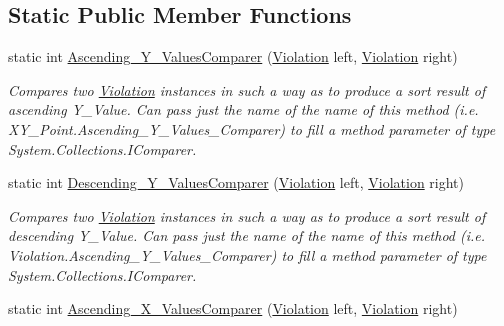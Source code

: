 \subsection*{Static Public Member Functions}
\begin{DoxyCompactItemize}
\item 
static int \mbox{\hyperlink{class_c_s_i_1_1_library_1_1_array_utilities_1_1_array_limit_checks_1_1_violation_a4e93e075cf895577206d1abfe44aa47f}{Ascending\+\_\+\+Y\+\_\+\+Values\+Comparer}} (\mbox{\hyperlink{class_c_s_i_1_1_library_1_1_array_utilities_1_1_array_limit_checks_1_1_violation}{Violation}} left, \mbox{\hyperlink{class_c_s_i_1_1_library_1_1_array_utilities_1_1_array_limit_checks_1_1_violation}{Violation}} right)
\begin{DoxyCompactList}\small\item\em Compares two \mbox{\hyperlink{class_c_s_i_1_1_library_1_1_array_utilities_1_1_array_limit_checks_1_1_violation}{Violation}} instances in such a way as to produce a sort result of ascending Y\+\_\+\+Value. Can pass just the name of the name of this method (i.\+e. X\+Y\+\_\+\+Point.\+Ascending\+\_\+\+Y\+\_\+\+Values\+\_\+\+Comparer) to fill a method parameter of type System.\+Collections.\+I\+Comparer. \end{DoxyCompactList}\item 
static int \mbox{\hyperlink{class_c_s_i_1_1_library_1_1_array_utilities_1_1_array_limit_checks_1_1_violation_a7c82d99abe8c6efbfcb6b7f58281c951}{Descending\+\_\+\+Y\+\_\+\+Values\+Comparer}} (\mbox{\hyperlink{class_c_s_i_1_1_library_1_1_array_utilities_1_1_array_limit_checks_1_1_violation}{Violation}} left, \mbox{\hyperlink{class_c_s_i_1_1_library_1_1_array_utilities_1_1_array_limit_checks_1_1_violation}{Violation}} right)
\begin{DoxyCompactList}\small\item\em Compares two \mbox{\hyperlink{class_c_s_i_1_1_library_1_1_array_utilities_1_1_array_limit_checks_1_1_violation}{Violation}} instances in such a way as to produce a sort result of descending Y\+\_\+\+Value. Can pass just the name of the name of this method (i.\+e. Violation.\+Ascending\+\_\+\+Y\+\_\+\+Values\+\_\+\+Comparer) to fill a method parameter of type System.\+Collections.\+I\+Comparer. \end{DoxyCompactList}\item 
static int \mbox{\hyperlink{class_c_s_i_1_1_library_1_1_array_utilities_1_1_array_limit_checks_1_1_violation_a152a375e0f4b3b218539d093b359452f}{Ascending\+\_\+\+X\+\_\+\+Values\+Comparer}} (\mbox{\hyperlink{class_c_s_i_1_1_library_1_1_array_utilities_1_1_array_limit_checks_1_1_violation}{Violation}} left, \mbox{\hyperlink{class_c_s_i_1_1_library_1_1_array_utilities_1_1_array_limit_checks_1_1_violation}{Violation}} right)

\end{DoxyCompactItemize}
